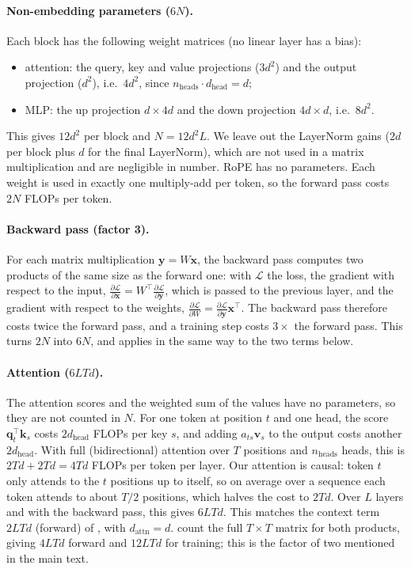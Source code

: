 \documentclass[10pt,twocolumn,a4paper]{article}
\newcommand{\vect}[1]{\bm{#1}}
\begin{document}
\paragraph{Non-embedding parameters ($6N$).} Each block has the following weight matrices (no linear layer has a bias):
\begin{itemize}
    \item attention: the query, key and value projections ($3d^2$) and the output projection ($d^2$), i.e.\ $4d^2$, since $n_\text{heads} \cdot d_\text{head} = d$;
    \item MLP: the up projection $d \times 4d$ and the down projection $4d \times d$, i.e.\ $8d^2$.
\end{itemize}
This gives $12d^2$ per block and $N = 12 d^2 L$. We leave out the LayerNorm gains ($2d$ per block plus $d$ for the final LayerNorm), which are not used in a matrix multiplication and are negligible in number. RoPE has no parameters. Each weight is used in exactly one multiply-add per token, so the forward pass costs $2N$ FLOPs per token.

\paragraph{Backward pass (factor 3).} For each matrix multiplication $\vect{y} = W\vect{x}$, the backward pass computes two products of the same size as the forward one: with $\mathcal{L}$ the loss, the gradient with respect to the input, $\frac{\partial \mathcal{L}}{\partial \vect{x}} = W^\top \frac{\partial \mathcal{L}}{\partial \vect{y}}$, which is passed to the previous layer, and the gradient with respect to the weights, $\frac{\partial \mathcal{L}}{\partial W} = \frac{\partial \mathcal{L}}{\partial \vect{y}} \vect{x}^\top$. The backward pass therefore costs twice the forward pass, and a training step costs $3\times$ the forward pass. This turns $2N$ into $6N$, and applies in the same way to the two terms below.

\paragraph{Attention ($6LTd$).} The attention scores and the weighted sum of the values have no parameters, so they are not counted in $N$. For one token at position $t$ and one head, the score $\vect{q}_t^\top \vect{k}_s$ costs $2 d_\text{head}$ FLOPs per key $s$, and adding $a_{ts} \vect{v}_s$ to the output costs another $2 d_\text{head}$. With full (bidirectional) attention over $T$ positions and $n_\text{heads}$ heads, this is $2Td + 2Td = 4Td$ FLOPs per token per layer. Our attention is causal: token $t$ only attends to the $t$ positions up to itself, so on average over a sequence each token attends to about $T/2$ positions, which halves the cost to $2Td$. Over $L$ layers and with the backward pass, this gives $6LTd$. This matches the context term $2LTd$ (forward) of \citet[Eq.~2.2]{kaplan2020scaling}, with $d_\text{attn} = d$. \citet{hoffmann2022training} count the full $T \times T$ matrix for both products, giving $4LTd$ forward and $12LTd$ for training; this is the factor of two mentioned in the main text.
\end{document}
